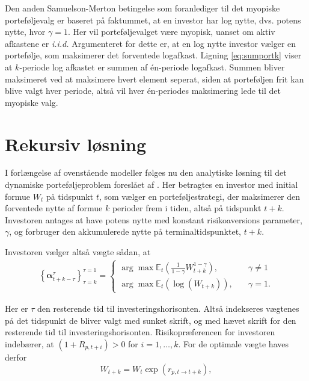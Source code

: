 \documentclass[
  a4paper,
  oneside]{memoir}
\begin{document}
Den anden Samuelson-Merton betingelse som foranlediger til det myopiske porteføljevalg er baseret på faktummet, at en investor har log nytte, dvs. potens nytte, hvor \(\gamma=1\). Her vil porteføljevalget være myopisk, uanset om aktiv afkastene er \emph{i.i.d.} Argumenteret for dette er, at en log nytte investor vælger en portefølje, som maksimerer det forventede logafkast. Ligning \eqref{eq:sumportk} viser at \(k\)-periode log afkastet er summen af én-periode logafkast. Summen bliver maksimeret ved at maksimere hvert element seperat, siden at porteføljen frit kan blive valgt hver periode, altså vil hver én-periodes maksimering lede til det myopiske valg.

\hypertarget{rekursiv-luxf8sning}{%
\section{Rekursiv løsning}\label{rekursiv-luxf8sning}}

I forlængelse af ovenstående modeller følges nu den analytiske løsning til det dynamiske porteføljeproblem foreslået af \citep{JurVic2011}. Her betragtes en investor med initial formue \(W_t\) på tidspunkt \(t\), som vælger en porteføljestrategi, der maksimerer den forventede nytte af formue \(k\) perioder frem i tiden, altså på tidspunkt \(t+k\). Investoren antages at have potens nytte med konstant risikoaversions parameter, \(\gamma\), og forbruger den akkumulerede nytte på terminaltidspunktet, \(t+k\).

Investoren vælger altså vægte sådan, at
\begin{align}
\left\{\bm{\alpha}_{t+k-\tau}^\tau\right\}_{\tau=k}^{\tau=1}=
\begin{cases}
\arg\max\mathbb{E}_t(\frac{1}{1-\gamma}W_{t+k}^{1-\gamma}),\quad &\gamma\neq 1\\
\arg\max\mathbb{E}_t(\log(W_{t+k})),\quad &\gamma=1.
\end{cases}
\end{align}

Her er \(\tau\) den resterende tid til investeringshorisonten. Altså indekseres vægtenes på det tidspunkt de bliver valgt med sunket skrift, og med hævet skrift for den resterende tid til investeringshorisonten. Risikopræferencen for investoren indebærer, at \((1+R_{p,t+i})>0\) for \(i=1,\dots,k\). For de optimale vægte haves derfor
\begin{equation}
W_{t+k}=W_t\exp(r_{p,t\to t+k}),\label{eq:formuetk}
\end{equation}
\end{document}
